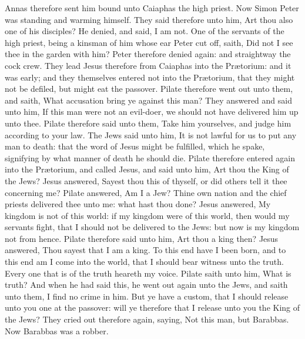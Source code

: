 Annas therefore sent him bound unto Caiaphas the high priest.  Now Simon Peter was standing and warming himself. They said therefore unto him, Art thou also one of his disciples? He denied, and said, I am not. One of the servants of the high priest, being a kinsman of him whose ear Peter cut off, saith, Did not I see thee in the garden with him? Peter therefore denied again: and straightway the cock crew.  They lead Jesus therefore from Caiaphas into the Prætorium: and it was early; and they themselves entered not into the Prætorium, that they might not be defiled, but might eat the passover. Pilate therefore went out unto them, and saith, What accusation bring ye against this man? They answered and said unto him, If this man were not an evil-doer, we should not have delivered him up unto thee. Pilate therefore said unto them, Take him yourselves, and judge him according to your law. The Jews said unto him, It is not lawful for us to put any man to death: that the word of Jesus might be fulfilled, which he spake, signifying by what manner of death he should die.  Pilate therefore entered again into the Prætorium, and called Jesus, and said unto him, Art thou the King of the Jews? Jesus answered, Sayest thou this of thyself, or did others tell it thee concerning me? Pilate answered, Am I a Jew? Thine own nation and the chief priests delivered thee unto me: what hast thou done? Jesus answered, My kingdom is not of this world: if my kingdom were of this world, then would my servants fight, that I should not be delivered to the Jews: but now is my kingdom not from hence. Pilate therefore said unto him, Art thou a king then? Jesus answered, Thou sayest that I am a king. To this end have I been born, and to this end am I come into the world, that I should bear witness unto the truth. Every one that is of the truth heareth my voice. Pilate saith unto him, What is truth? And when he had said this, he went out again unto the Jews, and saith unto them, I find no crime in him. But ye have a custom, that I should release unto you one at the passover: will ye therefore that I release unto you the King of the Jews? They cried out therefore again, saying, Not this man, but Barabbas. Now Barabbas was a robber. 

